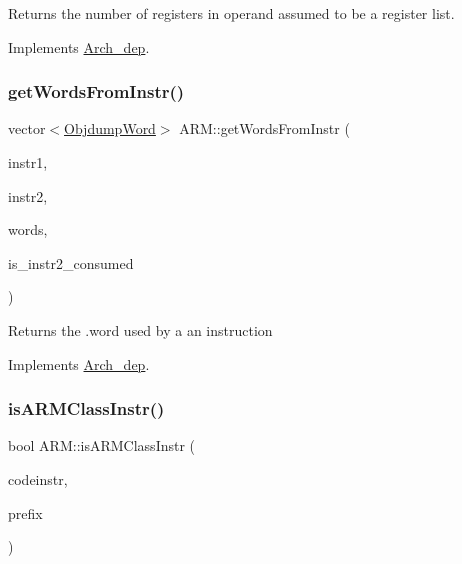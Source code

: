 Returns the number of registers in operand assumed to be a register list. 

Implements \hyperlink{classArch__dep_aff5899fb3e5793bf07f43512bfcc04e1}{Arch\+\_\+dep}.

\mbox{\label{classARM_a550a39c74ccd7308c20d1a3259f25ca2}} 
\subsubsection{\texorpdfstring{get\+Words\+From\+Instr()}{getWordsFromInstr()}}
{\footnotesize\ttfamily vector$<$\hyperlink{classObjdumpWord}{Objdump\+Word}$>$ A\+R\+M\+::get\+Words\+From\+Instr (\begin{DoxyParamCaption}\item[{const \hyperlink{classObjdumpInstruction}{Objdump\+Instruction} \&}]{instr1,  }\item[{const \hyperlink{classObjdumpInstruction}{Objdump\+Instruction} \&}]{instr2,  }\item[{vector$<$ \hyperlink{classObjdumpWord}{Objdump\+Word} $>$}]{words,  }\item[{bool \&}]{is\+\_\+instr2\+\_\+consumed }\end{DoxyParamCaption})\hspace{0.3cm}{\ttfamily [virtual]}}

Returns the .word used by a an instruction 

Implements \hyperlink{classArch__dep_a00e2fabd6cc0f5b9c36593a67f793d7a}{Arch\+\_\+dep}.

\mbox{\label{classARM_a76b4f8a8fe1fb702277f5a4f2b9475d2}} 
\subsubsection{\texorpdfstring{is\+A\+R\+M\+Class\+Instr()}{isARMClassInstr()}}
{\footnotesize\ttfamily bool A\+R\+M\+::is\+A\+R\+M\+Class\+Instr (\begin{DoxyParamCaption}\item[{const string \&}]{codeinstr,  }\item[{const string \&}]{prefix }\end{DoxyParamCaption})\hspace{0.3cm}{\ttfamily [virtual]}}



